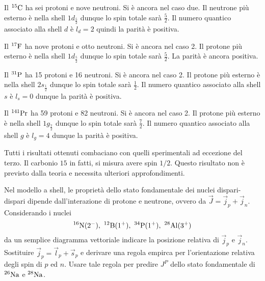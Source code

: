 \documentclass[../main.tex]{subfiles}
\begin{document}
\begin{svol}
		Il $ ^{15}\mathrm{C} $ ha sei protoni e nove neutroni. Si è ancora nel caso due. Il neutrone più esterno è nella shell $ 1d_{\frac{5}{2}} $ dunque lo spin totale sarà $ \frac{5}{2} $. Il numero quantico associato alla shell $ d $ è $ l_{d}=2 $ quindi la parità è positiva. 
		
		Il $ ^{17}\mathrm{F} $ ha nove protoni e otto neutroni. Si è ancora nel caso 2. Il protone più esterno è nella shell $ 1d_{\frac{5}{2}} $ dunque lo spin totale sarà $ \frac{5}{2} $. La parità è ancora positiva.
		
		Il $ ^{31}\mathrm{P} $ ha 15 protoni e 16 neutroni. Si è ancora nel caso 2. Il protone più esterno è nella shell $ 2s_{\frac{1}{2}} $ dunque lo spin totale sarà $ \frac{1}{2} $. Il numero quantico associato alla shell $ s $ è $ l_{s}=0 $ dunque la parità è positiva.
		
		Il $ ^{141}\mathrm{Pr} $ ha 59 protoni e 82 neutroni. Si è ancora nel caso 2. Il protone più esterno è nella shell $ 1g_{\frac{7}{2}} $ dunque lo spin totale sarà $ \frac{7}{2} $. Il numero quantico associato alla shell $ g $ è $ l_{g}=4 $ dunque la parità è positiva.
		
		Tutti i risultati ottenuti combaciano con quelli sperimentali ad eccezione del terzo. Il carbonio $ 15 $ in fatti, si misura avere spin $ 1/2 $. Questo risultato non è previsto dalla teoria e necessita ulteriori approfondimenti.
	\end{svol}
	\newpage
	\begin{ese}[7.5]
		Nel modello a shell, le proprietà dello stato fondamentale dei nuclei dispari-dispari dipende dall'interazione di protone e neutrone, ovvero da $ \vec{J}=\vec{j}_{p}+\vec{j}_{n} $. Considerando i nuclei $$ ^{16}\chem{N}(2^{-}),\ ^{12}\chem{B}(1^{+}),\ ^{34}\chem{P}(1^{+}),\ ^{28}\chem{Al}(3^{+}) $$ da un semplice diagramma vettoriale indicare la posizione relativa di $ \vec{j}_{p} $ e $ \vec{j}_{n} $. Sostituire $ \vec{j}_{p}=\vec{l}_{p}+\vec{s}_{p} $ e derivare una regola empirca per l'orientazione relativa degli spin di $ p $ ed $ n $. Usare tale regola per predire $ J^{P} $ dello stato fondamentale di $ ^{26}\mathrm{Na} $ e $ ^{28}\mathrm{Na} $.
	\end{ese}
\end{document}
